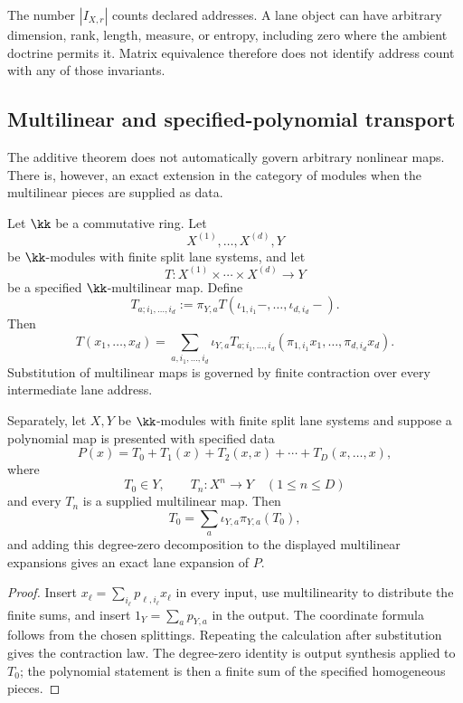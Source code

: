 \begin{remark}
\label{rem:block15-address-count-not-dimension}
The number \(|I_{X,r}|\) counts declared addresses.  A lane object can have
arbitrary dimension, rank, length, measure, or entropy, including zero where
the ambient doctrine permits it.  Matrix equivalence therefore does not
identify address count with any of those invariants.
\end{remark}

\subsection{Multilinear and specified-polynomial transport}
\label{subsec:block15-multilinear}

The additive theorem does not automatically govern arbitrary nonlinear maps.
There is, however, an exact extension in the category of modules when the
multilinear pieces are supplied as data.

\begin{theorem}
\label{thm:block15-multilinear-lane-expansion}
Let \(\kk\) be a commutative ring.  Let
\[
 X^{(1)},\ldots,X^{(d)},Y
\]
be \(\kk\)-modules with finite split lane systems, and let
\[
 T:X^{(1)}\times\cdots\times X^{(d)}\longrightarrow Y
\]
be a specified \(\kk\)-multilinear map.  Define
\[
 T_{a;i_1,\ldots,i_d}
 :=
 \pi_{Y,a}T
 (\iota_{1,i_1}-,\ldots,\iota_{d,i_d}-).
\]
Then
\[
 T(x_1,\ldots,x_d)
 =
 \sum_{a,i_1,\ldots,i_d}
 \iota_{Y,a}
 T_{a;i_1,\ldots,i_d}
 (\pi_{1,i_1}x_1,\ldots,\pi_{d,i_d}x_d).
\]
Substitution of multilinear maps is governed by finite contraction over every
intermediate lane address.

Separately, let \(X,Y\) be \(\kk\)-modules with finite split lane systems and
suppose a polynomial map is presented with specified data
\[
 P(x)=T_0+T_1(x)+T_2(x,x)+\cdots+T_D(x,\ldots,x),
\]
where
\[
 T_0\in Y,
 \qquad
 T_n:X^n\longrightarrow Y\quad(1\le n\le D)
\]
and every \(T_n\) is a supplied multilinear map.  Then
\[
 T_0=\sum_a\iota_{Y,a}\pi_{Y,a}(T_0),
\]
and adding this degree-zero decomposition to the displayed multilinear
expansions gives an exact lane expansion of \(P\).
\end{theorem}

\begin{proof}
Insert \(x_\ell=\sum_{i_\ell}p_{\ell,i_\ell}x_\ell\) in every input, use
multilinearity to distribute the finite sums, and insert
\(1_Y=\sum_a p_{Y,a}\) in the output.  The coordinate formula follows from
the chosen splittings.  Repeating the calculation after substitution gives
the contraction law.  The degree-zero identity is output synthesis applied
to \(T_0\); the polynomial statement is then a finite sum of the specified
homogeneous pieces.
\end{proof}

